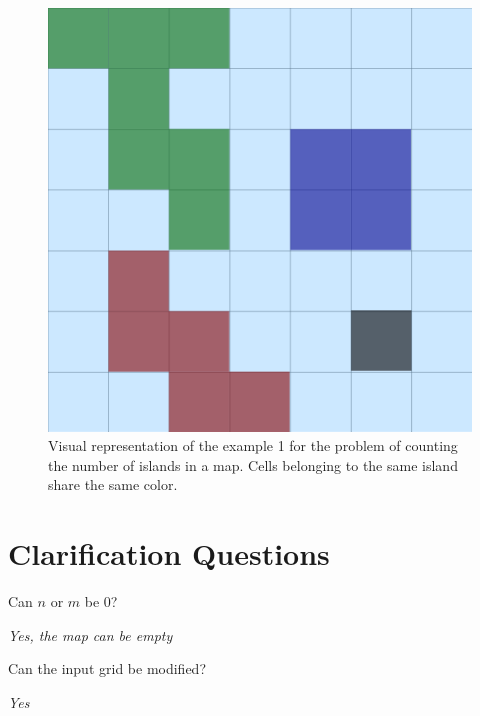 \begin{figure}
	\centering
	\includegraphics[scale=0.4]{sources/number_islands/images/example1}
	\caption{Visual representation of the example 1 for the problem of counting the number of islands in a map. Cells belonging to the same island share the same color.}
	\label{fig:number_islands:example1}
\end{figure}

\section{Clarification Questions}

\begin{QandA}
	\item Can $n$ or $m$ be $0$?
	\begin{answered}
		\textit{Yes, the map can be empty}
	\end{answered}
	\item Can the input grid be modified?
	\begin{answered}
		\textit{Yes}
	\end{answered}
\end{QandA}

